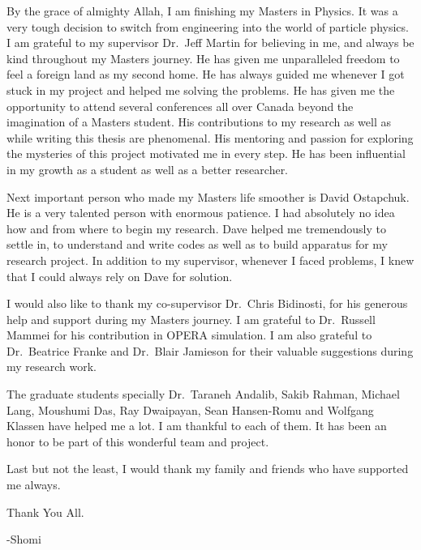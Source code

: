 \newpage
\tableofcontents
{}
\listoffigures
\listoftables

\begin{acknowledgments}
\vspace{2em}

By the grace of almighty Allah, I am finishing my Masters in Physics. It was a very tough decision to switch from engineering into the world of particle physics. I am grateful to my supervisor Dr.~Jeff Martin for believing in me, and always be kind throughout my Masters journey. He has given me unparalleled freedom to feel a foreign land as my second home. He has always guided me whenever I got stuck in my project and helped me solving the problems. He has given me the opportunity to attend several conferences all over Canada beyond the imagination of a Masters student. His contributions to my research as well as while writing this thesis are phenomenal. His mentoring and passion for exploring the mysteries of this project motivated me in every step. He has been influential in my growth as a student as well as a better researcher. 

Next important person who made my Masters life smoother is David Ostapchuk. He is a very talented person with enormous patience. I had absolutely no idea how and from where to begin my research. Dave helped me tremendously to settle in, to understand and write codes as well as to build apparatus for my research project. In addition to my supervisor, whenever I faced problems, I knew that I could always rely on Dave for solution.

I would also like to thank my co-supervisor Dr.~Chris Bidinosti, for his generous help and support during my Masters journey. I am grateful to Dr.~Russell Mammei for his contribution in OPERA simulation. I am also grateful to Dr.~Beatrice Franke and Dr.~Blair Jamieson for their valuable suggestions during my research work. 

The graduate students specially Dr.~Taraneh Andalib, Sakib Rahman, Michael Lang, Moushumi Das, Ray Dwaipayan, Sean Hansen-Romu and Wolfgang Klassen have helped me a lot. I am thankful to each of them. It has been an honor to be part of this wonderful team and project.

Last but not the least, I would thank my family and friends who have supported me always. 

\vspace{2em}
Thank You All.

-Shomi

\end{acknowledgments}

